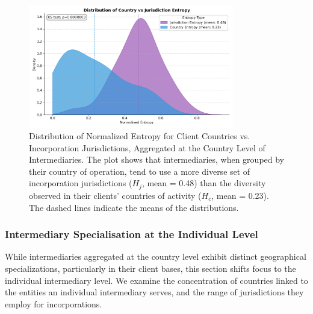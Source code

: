 \begin{figure}[htbp]
    \centering
    \includegraphics[width=0.8\textwidth]{images/Geography_Country_Level_Entropy_Distribution.png}
    \caption{Distribution of Normalized Entropy for Client Countries vs. Incorporation Jurisdictions, Aggregated at the Country Level of Intermediaries. The plot shows that intermediaries, when grouped by their country of operation, tend to use a more diverse set of incorporation jurisdictions ($H_j$, mean = 0.48) than the diversity observed in their clients' countries of activity ($H_c$, mean = 0.23). The dashed lines indicate the means of the distributions.}
    \label{fig:geography_country_level_entropy_distribution}
\end{figure}

\subsubsection{Intermediary Specialisation at the Individual Level}
\label{subsubsec:network_countries_served} 

While intermediaries aggregated at the country level exhibit distinct geographical specializations, particularly in their client bases, this section shifts focus to the individual intermediary level. We examine the concentration of countries linked to the entities an individual intermediary serves, and the range of jurisdictions they employ for incorporations.

